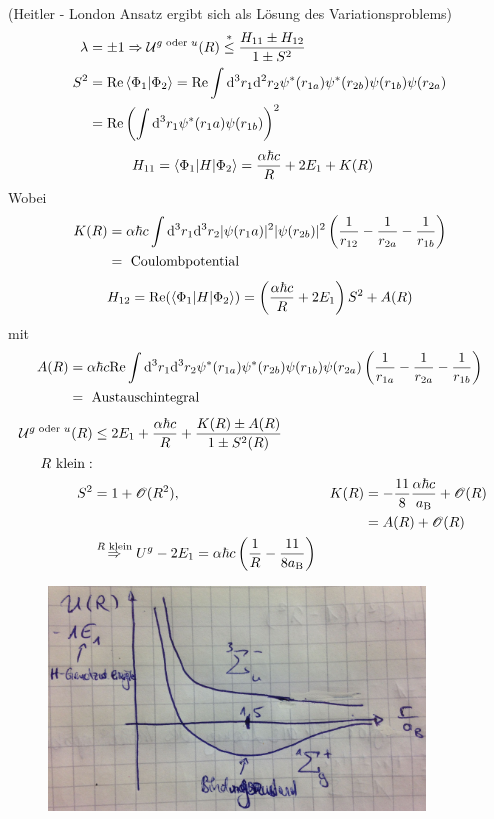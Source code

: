 (Heitler - London Ansatz ergibt sich als Lösung des Variationsproblems)
	\begin{align*}
		\lambda &= \pm 1 \Rightarrow \mathcal{U}^{g \text{ oder }u} (R) 
		\overset{*}{\leq} \frac{H_{11} \pm H_{12}}{1 \pm S^2} \\
		S^2 &= \mathrm{Re}\braket{\Phi_1 | \Phi_2} 
		= \mathrm{Re} \int \mathrm{d}^3 r_1 \mathrm{d}^2 r_2 \psi^* (r_{1a}) \psi^* (r_{2b}) \psi(r_{1b}) \psi (r_{2a}) \\
		&= \mathrm{Re} \left(\int \mathrm{d}^3 r_1 \psi^*(r_1a) \psi (r_{1b})\right)^2 \\
	\end{align*}
	\begin{align*}
		H_{11} &= \braket{\Phi_1 | H | \Phi_2} =
		\frac{\alpha \hbar c}{R} + 2 E_1 + K(R)
	\end{align*}
Wobei 
	\begin{align*}
		K(R) &= \alpha \hbar c \int \mathrm{d}^3 r_1 \mathrm{d}^3 r_2 |\psi (r_1a)|^2 
		|\psi (r_{2b})|^2 \left(\frac{1}{r_{12}} - \frac{1}{r_{2a}} - \frac{1}{r_{1b}}\right) \\
		&= \text{ Coulombpotential}
	\end{align*}
	\begin{align*}
		H_{12} = \mathrm{Re} (\braket{\Phi_1 | H | \Phi_2}) 
		= \left(\frac{\alpha \hbar c}{R} + 2 E_1\right) S^2 + A(R) 
	\end{align*}
mit 
	\begin{align*}
		A(R) &= \alpha \hbar c \mathrm{Re} \int \mathrm{d}^3 r_1 \mathrm{d}^3 r_2 \psi^* (r_{1a}) \psi^* (r_{2b}) \psi(r_{1b}) \psi (r_{2a}) \left(\frac{1}{r_{1a}} - \frac{1}{r_{2a}} - \frac{1}{r_{1b}}\right)\\
		&= \text{ Austauschintegral}
	\end{align*}
	\begin{align*}
		\mathcal{U}^{g \text{ oder }u} (R) &\leq 2 E_1 + \frac{\alpha \hbar c}{R} + 
		\frac{K(R) \pm A(R)}{1 \pm S^2(R)} \\
		R \text{ klein}:& \\
		S^2 &= 1 + \mathscr{O} (R^2) ,&
		K(R) &= - \frac{11}{8} \frac{\alpha \hbar c}{a_{\mathrm{B}}} + \mathscr{O} (R) \\
		& & &= A(R) + \mathscr{O} (R)\\
		&\overset{R \text{ klein}}{\Rightarrow} U^g - 2E_1 = \alpha \hbar c 
		\left(\frac{1}{R} - \frac{11}{8 a_{\mathrm{B}}}\right) 
	\end{align*}
	\begin{figure} [h]
		\begin{center}
			\includegraphics[width=10cm]{Homonukleare_Molekuele4}
		\end{center}
	\end{figure}
